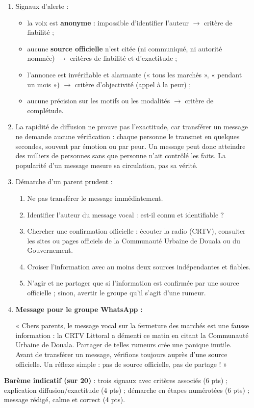\documentclass[11pt]{article}
\newcommand{\cle}[1]{{\popxbold\color{popdark}#1}}
\begin{document}
\begin{corrige}
\begin{enumerate}
\item Signaux d'alerte :
\begin{itemize}
\item la voix est \textbf{anonyme} : impossible d'identifier l'auteur $\rightarrow$ critère de \cle{fiabilité} ;
\item aucune \textbf{source officielle} n'est citée (ni communiqué, ni autorité nommée) $\rightarrow$ critères de \cle{fiabilité} et d'\cle{exactitude} ;
\item l'annonce est invérifiable et alarmante (« tous les marchés », « pendant un mois ») $\rightarrow$ critère d'\cle{objectivité} (appel à la peur) ;
\item aucune précision sur les motifs ou les modalités $\rightarrow$ critère de \cle{complétude}.
\end{itemize}
\item La rapidité de diffusion ne prouve pas l'exactitude, car transférer un message ne demande aucune vérification : chaque personne le transmet en quelques secondes, souvent par émotion ou par peur. Un message peut donc atteindre des milliers de personnes sans que personne n'ait contrôlé les faits. La popularité d'un message mesure sa circulation, pas sa vérité.
\item Démarche d'un parent prudent :
\begin{enumerate}
\item Ne pas transférer le message immédiatement.
\item Identifier l'auteur du message vocal : est-il connu et identifiable ?
\item Chercher une confirmation officielle : écouter la radio (CRTV), consulter les sites ou pages officiels de la Communauté Urbaine de Douala ou du Gouvernement.
\item Croiser l'information avec au moins deux sources indépendantes et fiables.
\item N'agir et ne partager que si l'information est confirmée par une source officielle ; sinon, avertir le groupe qu'il s'agit d'une rumeur.
\end{enumerate}
\item \textbf{Message pour le groupe WhatsApp :}

« Chers parents, le message vocal sur la fermeture des marchés est une fausse information : la CRTV Littoral a démenti ce matin en citant la Communauté Urbaine de Douala. Partager de telles rumeurs crée une panique inutile. Avant de transférer un message, vérifions toujours auprès d'une source officielle. Un réflexe simple : pas de source officielle, pas de partage ! »
\end{enumerate}
\textbf{Barème indicatif (sur 20)} : trois signaux avec critères associés (6 pts) ; explication diffusion/exactitude (4 pts) ; démarche en étapes numérotées (6 pts) ; message rédigé, calme et correct (4 pts).


\end{corrige}
\end{document}
